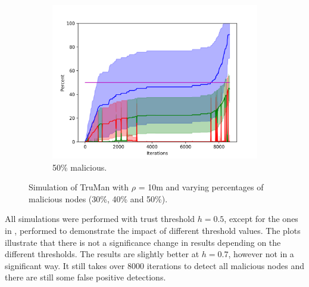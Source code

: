 \begin{figure}
\centering
\begin{subfigure}{0.5\textwidth}
\includegraphics[width=\linewidth]{images/plots/Network_rA/10_50.png}
\caption{50\% malicious.}
\end{subfigure}

\caption{Simulation of TruMan with $\rho$ = 10m and varying percentages of malicious nodes (30\%, 40\% and 50\%).}
\label{fig:randommalicious2}
\end{figure}

\pagebreak
All simulations were performed with trust threshold $h=0.5$, except for the ones in , performed to demonstrate the impact of different threshold values.
The plots illustrate that there is not a significance change in results depending on the different thresholds.
The results are slightly better at $h=0.7$, however not in a significant way.
It still takes over 8000 iterations to detect all malicious nodes and there are still some false positive detections.

